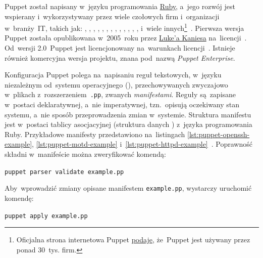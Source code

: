 \documentclass[thesis]{subfiles}
\begin{document}
Puppet został napisany w~języku programowania \href{https://en.wikipedia.org/wiki/Ruby_(programming_language)}{Ruby}, a~jego rozwój jest wspierany i~wykorzystywany przez wiele czołowych firm i~organizacji w~branży~IT, takich jak: \emph{\google{}}, \emph{\nasa{}}, \emph{\intel{}}, , , , \emph{\twitter{}}, \emph{\uber{}}, , \emph{\cern{}}, \emph{\stanford{}}, \emph{\wikipedia{}}, \emph{\paypal{}}, \emph{\dell{}} i~wiele innych\footnote{Oficjalna strona internetowa Puppet \href{https://puppet.com/company/leadership/luke-kanies}{podaje}, że~Puppet jest używany przez ponad 30~tys. firm.}~\cite{puppet,puppet-google,puppet-cern,puppet-chef-disney}. Pierwsza wersja Puppet została opublikowana w~2005~roku przez \href{https://puppet.com/company/leadership/luke-kanies}{Luke'a Kaniesa} na~licencji~. Od~wersji 2.0~Puppet jest licencjonowany na~warunkach licencji~. Istnieje również komercyjna wersja projektu, znana pod~nazwą \emph{Puppet Enterprise}.

Konfiguracja Puppet polega na~napisaniu reguł tekstowych, w~języku niezależnym od~systemu operacyjnego (), przechowywanych zwyczajowo w~plikach z~rozszerzeniem~\texttt{.pp}, zwanych \emph{manifestami}. Reguły są~zapisane w~postaci deklaratywnej, a~nie imperatywnej, tzn.~opisują oczekiwany stan systemu, a~nie sposób przeprowadzenia zmian w~systemie. Struktura manifestu jest w~postaci tablicy asocjacyjnej (struktura danych ) z~języka programowania Ruby. Przykładowe manifesty przedstawiono na~listingach \ref{lst:puppet-openssh-example}, \ref{lst:puppet-motd-example} i~\ref{lst:puppet-httpd-example}~\cite{puppet-examples}. Poprawność składni w~manifeście  można zweryfikować komendą:\mynobreakpar
\begin{center}
	\texttt{puppet parser validate example.pp}
\end{center}

Aby~wprowadzić zmiany opisane manifestem \texttt{example.pp}, wystarczy uruchomić komendę:\mynobreakpar
\begin{center}
	\texttt{puppet apply example.pp}
\end{center}
\end{document}

